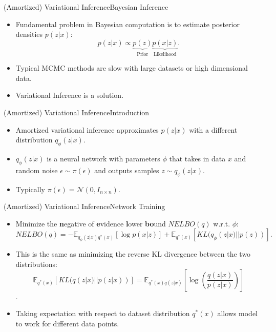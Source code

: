 \documentclass[handout]{beamer}
\newcommand{\E}{\mathbb{E}}
\begin{document}
\begin{frame}{(Amortized) Variational Inference}{Bayesian Inference}
  \begin{itemize}
  \item {
    Fundamental problem in Bayesian computation is to estimate posterior densities $p(z|x)$:
  }
  \begin{equation*}
p(z|x)\propto \underbrace{p(z)}_\text{Prior}\underbrace{p(x|z)}_\text{Likelihood}.
\end{equation*}
  \item {
    Typical MCMC methods are slow with large datasets or high dimensional data.
  }
  \vspace{0.5cm}
  \item {
    Variational Inference is a solution.
  }
  \end{itemize}
\end{frame}
\begin{frame}{(Amortized) Variational Inference}{Introduction}
\begin{itemize}
\item Amortized variational inference approximates $p(z|x)$ with a different distribution $q_\phi(z|x)$.
\item $q_\phi(z|x)$ is a neural network with parameters $\phi$ that takes in data $x$ and random noise $\epsilon\sim \pi(\epsilon)$ and outputs samples $z\sim q_\phi(z|x)$.
\item Typically $\pi(\epsilon)=\mathcal{N}(0,I_{n\times n})$.
\begin{figure}[h]
  \centering
\end{figure}
\end{itemize}
\end{frame}
\begin{frame}{(Amortized) Variational Inference}{Network Training}
\begin{itemize}
\item Minimize the \textbf{n}egative of \textbf{e}vidence \textbf{l}ower \textbf{bo}und $NELBO(q)$ w.r.t. $\phi$:
\[NELBO(q)=-\mathbb{E}_{q_\phi(z|x)q^*(x)}[\log p(x|z)]+\mathbb{E}_{q^*(x)}[KL(q_\phi(z|x)||p(z))].\]
\item This is the same as minimizing the reverse KL divergence between the two distributions:
\[\E_{q^*(x)}[KL(q(z|x)||p(z|x))]=\mathbb{E}_{q^*(x)q(z|x)}\left[\log \left(\frac{q(z|x)}{p(z|x)}\right)\right]\].
\item Taking expectation with respect to dataset distribution $q^*(x)$ allows model to work for different data points.
\end{itemize}
\end{frame}
\end{document}
